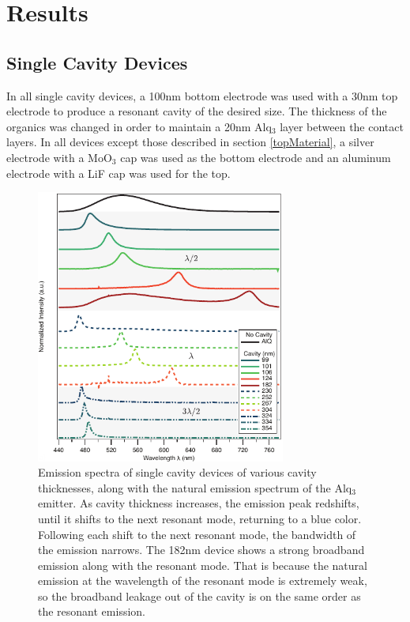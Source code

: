 \documentclass{report}
\begin{document}
\chapter{Results}

    \section{Single Cavity Devices} \label{n=1}

        In all single cavity devices, a 100nm bottom electrode was used with a 30nm top electrode to produce a resonant cavity of the desired size. The thickness of the organics was changed in order to maintain a 20nm Alq$_3$ layer between the contact layers. In all devices except those described in section \ref{topMaterial}, a silver electrode with a MoO$_3$ cap was used as the bottom electrode and an aluminum electrode with a LiF cap was used for the top.
    
        \begin{figure}[h!]%
            \centering
            \includegraphics[width=0.73\textwidth]{images/n1_spectra.png}
            \caption{Emission spectra of single cavity devices of various cavity thicknesses, along with the natural emission spectrum of the Alq$_3$ emitter. As cavity thickness increases, the emission peak redshifts, until it shifts to the next resonant mode, returning to a blue color. Following each shift to the next resonant mode, the bandwidth of the emission narrows. The 182nm device shows a strong broadband emission along with the resonant mode. That is because the natural emission at the wavelength of the resonant mode is extremely weak, so the broadband leakage out of the cavity is on the same order as the resonant emission.}
            \label{fig:n1_spectra}
        \end{figure}
        
\end{document}
